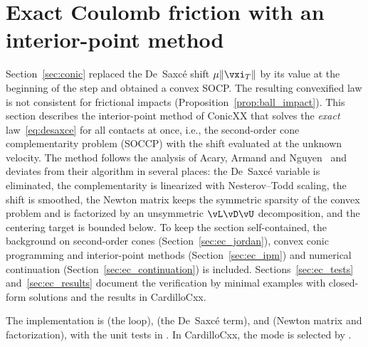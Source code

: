 \section{Exact Coulomb friction with an interior-point method}\label{sec:exact_coulomb}
%
Section~\ref{sec:conic} replaced the De~Saxc\'e shift $\mu\|\vxi_T\|$ by its value at the beginning of the step and obtained a convex SOCP. The resulting convexified law is not consistent for frictional impacts (Proposition~\ref{prop:ball_impact}). This section describes the interior-point method of ConicXX that solves the \emph{exact} law~\eqref{eq:desaxce} for all contacts at once, i.e., the second-order cone complementarity problem (SOCCP) with the shift evaluated at the unknown velocity. The method follows the analysis of Acary, Armand and Nguyen~\cite{Acary2026} and deviates from their algorithm in several places: the De~Saxc\'e variable is eliminated, the complementarity is linearized with Nesterov--Todd scaling, the shift is smoothed, the Newton matrix keeps the symmetric sparsity of the convex problem and is factorized by an unsymmetric $\vL\vD\vU$ decomposition, and the centering target is bounded below. To keep the section self-contained, the background on second-order cones (Section~\ref{sec:ec_jordan}), convex conic programming and interior-point methods (Section~\ref{sec:ec_ipm}) and numerical continuation (Section~\ref{sec:ec_continuation}) is included. Sections~\ref{sec:ec_tests} and~\ref{sec:ec_results} document the verification by minimal examples with closed-form solutions and the results in CardilloCxx.

The implementation is  (the loop),  (the De~Saxc\'e term),  and  (Newton matrix and factorization), with the unit tests in . In CardilloCxx, the mode is selected by .
%
